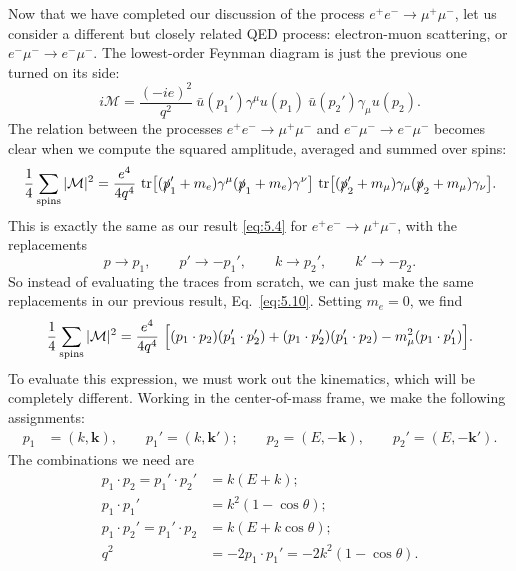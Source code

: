 Now that we have completed our discussion of the process
$e^{+}e^{-}\to\mu^{+}\mu^{-}$, let us consider a different but closely related
QED process: electron-muon scattering, or $e^{-}\mu^{-}\to e^{-}\mu^{-}$.  The
lowest-order Feynman diagram is just the previous one turned on its side:
\begin{equation}
  i\mathcal{M} = \frac{(-ie)^2}{q^2}\ \bar{u}(p_1')\gamma^\mu u(p_1)\
    \bar{u}(p_2')\gamma_\mu u(p_2) .
\end{equation}
The relation between the processes $e^{+}e^{-}\to\mu^{+}\mu^{-}$ and
$e^{-}\mu^{-}\to e^{-}\mu^{-}$ becomes clear when we compute the squared
amplitude, averaged and summed over spins:
\begin{equation}
  \frac{1}{4}\sum_{\text{spins}}|\mathcal{M}|^2
    = \frac{e^4}{4q^4}\ \mathrm{tr}\bigl[
      (\slashed{p}_1' + m_e)\gamma^\mu(\slashed{p}_1 + m_e)\gamma^\nu \bigr]\
      \mathrm{tr}\bigl[ (\slashed{p}_2' + m_\mu)\gamma_\mu(\slashed{p}_2
        + m_\mu)\gamma_\nu \bigr] .
\end{equation}
This is exactly the same as our result \eqref{eq:5.4} for
$e^{+}e^{-}\to\mu^{+}\mu^{-}$, with the replacements
\begin{equation}
  p \to p_1,\qquad p' \to -p_1',\qquad k \to p_2',\qquad k' \to -p_2 .
  \label{eq:5.60}
\end{equation}
So instead of evaluating the traces from scratch, we can just make the same
replacements in our previous result, Eq.~\eqref{eq:5.10}.  Setting $m_e = 0$,
we find
\begin{equation}
  \frac{1}{4}\sum_{\text{spins}}|\mathcal{M}|^2
    = \frac{e^4}{4q^4}\ \Bigl[ (p_1\cdot p_2)(p_1'\cdot p_2')
      + (p_1\cdot p_2')(p_1'\cdot p_2) - m_\mu^2(p_1\cdot p_1') \Bigr] .
  \label{eq:5.61}
\end{equation}
To evaluate this expression, we must work out the kinematics, which will be
completely different.  Working in the center-of-mass frame, we make the
following assignments:
\begin{equation}
  \begin{aligned}
    p_1 &= (k, \mathbf{k}),\qquad p_1' = (k, \mathbf{k}');\qquad
    p_2 = (E, -\mathbf{k}),\qquad p_2' = (E, -\mathbf{k}').
  \end{aligned}
\end{equation}
The combinations we need are
\begin{equation}
  \begin{aligned}
    p_1\cdot p_2 = p_1'\cdot p_2' &= k(E+k);\\
    p_1\cdot p_1' &= k^2(1-\cos\theta);\\
    p_1\cdot p_2' = p_1'\cdot p_2 &= k(E+k\cos\theta);\\
    q^2 &= -2p_1\cdot p_1' = -2k^2(1-\cos\theta) .
  \end{aligned}
\end{equation}
